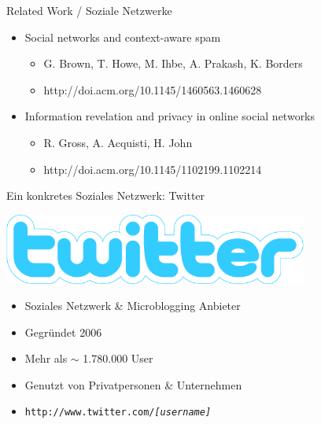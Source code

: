 \documentclass[11pt]{beamer}
\begin{document}
\begin{frame}{Related Work / Soziale Netzwerke}
  \begin{itemize}
    \item Social networks and context-aware spam
    \begin{itemize}
      \item  G. Brown, T. Howe, M. Ihbe, A. Prakash, K. Borders
      \item http://doi.acm.org/10.1145/1460563.1460628
    \end{itemize}
    \item Information revelation and privacy in online social networks
    \begin{itemize}
      \item R. Gross, A. Acquisti, H.  John
      \item http://doi.acm.org/10.1145/1102199.1102214
    \end{itemize}
  \end{itemize}
\end{frame}

\begin{frame}[t]{Ein konkretes Soziales Netzwerk: Twitter}
  \begin{center}
    \includegraphics[width=0.75\textwidth]{twitter_logo}
  \end{center}
  \begin{itemize}
    \item Soziales Netzwerk \& Microblogging Anbieter
    \item Gegründet 2006
    \item Mehr als $\sim$ 1.780.000 User
    \item Genutzt von Privatpersonen \& Unternehmen
    \item \texttt{http://www.twitter.com/\textit{[username]}}
  \end{itemize}
\end{frame}
\end{document}
